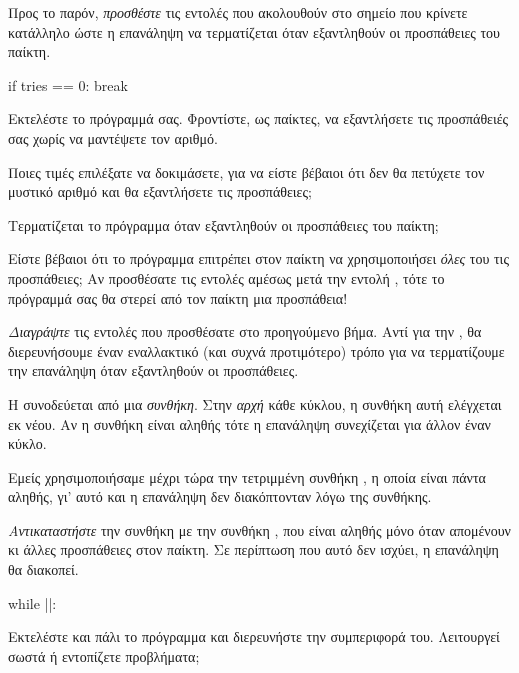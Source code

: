 \documentclass[a4paper,11pt,oneside]{book}
\begin{document}
\begin{step}
Προς το παρόν, \emph{προσθέστε} τις εντολές που ακολουθούν στο σημείο που κρίνετε κατάλληλο ώστε η επανάληψη να τερματίζεται όταν εξαντληθούν οι προσπάθειες του παίκτη.

\begin{pynew}
    if tries == 0:
        break
\end{pynew}

Εκτελέστε το πρόγραμμά σας. Φροντίστε, ως παίκτες, να εξαντλήσετε τις προσπάθειές σας χωρίς να μαντέψετε τον αριθμό. 

Ποιες τιμές επιλέξατε να δοκιμάσετε, για να είστε βέβαιοι ότι δεν θα πετύχετε τον μυστικό αριθμό και θα εξαντλήσετε τις προσπάθειες;

\marginnote[14pt]{\icondiscuss}
\dottedline

Τερματίζεται το πρόγραμμα όταν εξαντληθούν οι προσπάθειες του παίκτη;

\marginnote[14pt]{\icondiscuss}
\dottedline

\marginnote[10pt]{\iconcaution}
Είστε βέβαιοι ότι το πρόγραμμα επιτρέπει στον παίκτη να χρησιμοποιήσει \emph{όλες} του τις προσπάθειες; Αν προσθέσατε τις εντολές αμέσως μετά την εντολή , τότε το πρόγραμμά σας θα στερεί από τον παίκτη μια προσπάθεια!
\end{step}

\begin{step}
\emph{Διαγράψτε} τις εντολές που προσθέσατε στο προηγούμενο βήμα. Αντί για την , θα διερευνήσουμε έναν εναλλακτικό (και συχνά προτιμότερο) τρόπο για να τερματίζουμε την επανάληψη όταν εξαντληθούν οι προσπάθειες.


Η  συνοδεύεται από μια \emph{συνθήκη}. Στην \emph{αρχή} κάθε κύκλου, η συνθήκη αυτή ελέγχεται εκ νέου. Αν η συνθήκη είναι αληθής τότε η επανάληψη συνεχίζεται για άλλον έναν κύκλο. 

Εμείς χρησιμοποιήσαμε μέχρι τώρα την τετριμμένη συνθήκη , η οποία είναι πάντα αληθής, γι' αυτό και η επανάληψη δεν διακόπτονταν λόγω της συνθήκης.

\emph{Αντικαταστήστε} την συνθήκη  με την συνθήκη , που είναι αληθής μόνο όταν απομένουν κι άλλες προσπάθειες στον παίκτη. Σε περίπτωση που αυτό δεν ισχύει, η επανάληψη θα διακοπεί.

\begin{pyplain}
while ||:
\end{pyplain}

Εκτελέστε και πάλι το πρόγραμμα και διερευνήστε την συμπεριφορά του. Λειτουργεί σωστά ή εντοπίζετε προβλήματα;

\marginnote[14pt]{\icondiscuss}
\dottedline
\end{step}
\end{document}
